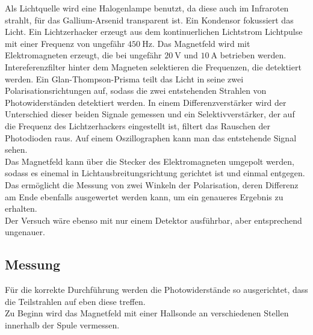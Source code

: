Als Lichtquelle wird eine Halogenlampe benutzt, da diese auch im Infraroten strahlt, für das Gallium-Arsenid transparent ist. Ein Kondensor fokussiert das Licht. Ein Lichtzerhacker erzeugt aus dem kontinuerlichen
Lichtstrom Lichtpulse mit einer Frequenz von ungefähr $\qty{450}{\hertz}$. Das Magnetfeld wird mit Elektromagneten erzeugt, die bei ungefähr $\qty{20}{\volt}$ und $\qty{10}{\ampere}$ betrieben werden. Intereferenzfilter hinter
dem Magneten selektieren die Frequenzen, die detektiert werden. Ein Glan-Thompson-Prisma teilt das Licht in seine zwei Polarisationsrichtungen auf, sodass die zwei entstehenden Strahlen von Photowiderständen detektiert werden.
In einem Differenzverstärker wird der Unterschied dieser beiden Signale gemessen und ein Selektivverstärker, der auf die Frequenz des Lichtzerhackers eingestellt ist, filtert das Rauschen der Photodioden raus. Auf einem Oszillographen
kann man das entstehende Signal sehen. \\

Das Magnetfeld kann über die Stecker des Elektromagneten umgepolt werden, sodass es einemal in Lichtausbreitungsrichtung gerichtet ist und einmal entgegen. Das ermöglicht die Messung von zwei Winkeln der Polarisation,
deren Differenz am Ende ebenfalls ausgewertet werden kann, um ein genaueres Ergebnis zu erhalten. \\

Der Versuch wäre ebenso mit nur einem Detektor ausführbar, aber entsprechend ungenauer.\\

\subsection{Messung}

Für die korrekte Durchführung werden die Photowiderstände so ausgerichtet, dass die Teilstrahlen auf eben diese treffen. \\
Zu Beginn wird das Magnetfeld mit einer Hallsonde an verschiedenen Stellen innerhalb der Spule vermessen. \\

